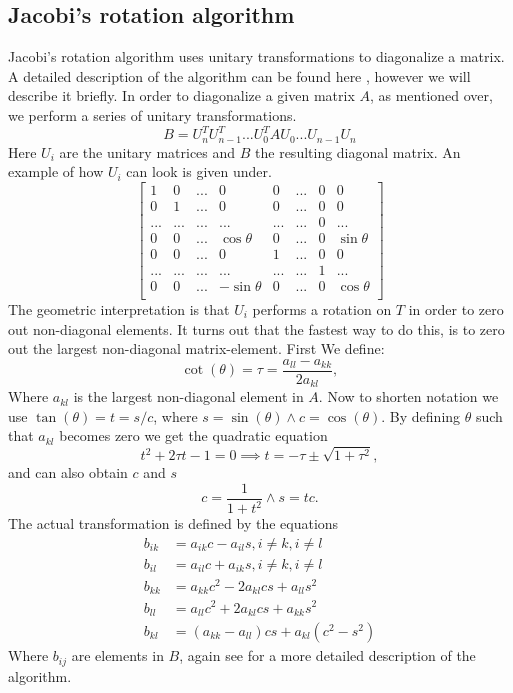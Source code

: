 \documentclass[reprint,english,notitlepage]{revtex4-1}  %
\begin{document}
\subsection{Jacobi's rotation algorithm}
Jacobi's rotation algorithm uses unitary transformations to diagonalize a matrix. A detailed description of the algorithm can be found here \citep{lecnotes}, however we will describe it briefly. In order to diagonalize a given matrix $A$, as mentioned over, we perform a series of unitary transformations.
\begin{equation*}
	B = U_n^T U_{n-1}^T ... U_0^T A U_0 ... U_{n-1}U_n
\end{equation*}
Here $U_i$ are the unitary matrices and $B$ the resulting diagonal matrix. An example of how $U_i$ can look is given under.
\begin{equation*}
	  \begin{bmatrix}
	1  & 0 & ...  & 0 & 0 & ... & 0 & 0 \\
	0 & 1  & ... & 0 & 0 & ... & 0 & 0 \\
	...  & ... & ... & ... & ... & ... & 0 & ... \\
	0  & 0 & ... & \cos \theta & 0 & ... & 0 & \sin \theta \\
	0  & 0 & ... & 0 & 1 & ... & 0 & 0 \\
	...  & ...& ...  &... & ...   & ... &1 &...  \\
	0  & 0& ...  & -\sin \theta &0 & ... &0 &\cos \theta  \\
	\end{bmatrix}
\end{equation*}
The geometric interpretation is that $U_i$ performs a rotation on $T$ in order to zero out non-diagonal elements. It turns out that the fastest way to do this, is to zero out the largest non-diagonal matrix-element. First We define:
\begin{equation*}
	\cot(\theta) = \tau = \frac{a_{ll} - a_{kk}}{2a_{kl}},
\end{equation*}
Where $a_{kl}$ is the largest non-diagonal element in $A$. Now to shorten notation we use $\tan(\theta) = t = s/c$, where $s = \sin(\theta) \wedge c = \cos(\theta)$. By defining $\theta$ such that $a_{kl}$ becomes zero we get the quadratic equation
\begin{equation*}
	t^2 + 2\tau t -1 = 0 \implies t = -\tau \pm \sqrt{1+\tau^2},
\end{equation*}
and can also obtain $c$ and $s$
\begin{equation*}
	c = \frac{1}{1+t^2} \wedge s = tc.
\end{equation*}
The actual transformation is defined by the equations
\begin{align*}
	b_{ik} &= a_{ik}c - a_{il}s, i \neq k, i \neq l \\ 
	b_{il} &= a_{il}c + a_{ik}s, i \neq k, i \neq l \\
	b_{kk} &= a_{kk}c^2 - 2a_{kl}cs + a_{ll}s^2 \\
	b_{ll} &= a_{ll}c^2 + 2a_{kl}cs + a_{kk}s^2 \\
	b_{kl} &= (a_{kk} - a_{ll} )cs + a_{kl}(c^2 - s^2)
\end{align*}
Where $b_{ij}$ are elements in $B$, again see \citep{lecnotes} for a more detailed description of the algorithm.
\end{document}
